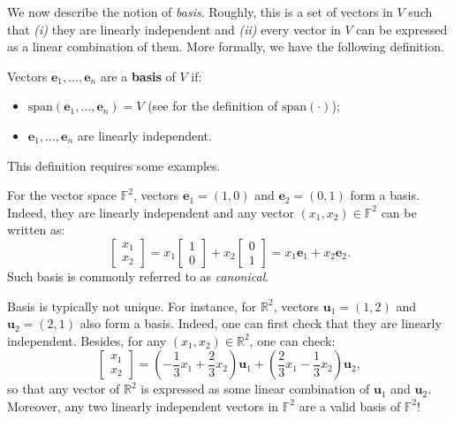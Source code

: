 \documentclass[../../book.tex]{subfiles}
\begin{document}
We now describe the notion of \textit{basis}. 
Roughly, this is a set of vectors in $V$ such that \textit{(i)} they are linearly independent and \textit{(ii)} every vector in $V$ can be expressed as a linear combination of them.
More formally, we have the following definition.
\begin{definition}
    Vectors $\mathbf{e}_1,\dots,\mathbf{e}_n$ are a \textbf{basis} of $V$ if:
    \begin{itemize}
        \item $\text{span}(\mathbf{e}_1,\dots,\mathbf{e}_n) = V$ (see  for the definition of $\text{span}(\cdot)$);
        \item $\mathbf{e}_1,\dots,\mathbf{e}_n$ are linearly independent.
    \end{itemize}
\end{definition}

This definition requires some examples.

\begin{example}
    For the vector space $\mathbb{F}^2$, vectors $\mathbf{e}_1=(1,0)$ and $\mathbf{e}_2=(0,1)$ form a basis.
    Indeed, they are linearly independent and any vector $(x_1,x_2) \in \mathbb{F}^2$ can be written as:
    \begin{equation*}
        \begin{bmatrix}
            x_1 \\ x_2
        \end{bmatrix} = x_1\begin{bmatrix}
            1 \\ 0
        \end{bmatrix} + x_2\begin{bmatrix}
            0 \\ 1
        \end{bmatrix} = x_1\mathbf{e}_1 + x_2\mathbf{e}_2.
    \end{equation*}
    Such basis is commonly referred to as \textit{canonical}. 
\end{example}

\begin{example}
    Basis is typically not unique. 
    For instance, for $\mathbb{R}^2$, vectors $\mathbf{u}_1=(1,2)$ and $\mathbf{u}_2=(2,1)$ also form a basis.
    Indeed, one can first check that they are linearly independent. 
    Besides, for any $(x_1,x_2) \in \mathbb{R}^2$, one can check:
    \begin{equation*}
        \begin{bmatrix}
            x_1 \\ x_2
        \end{bmatrix} = \left(-\frac{1}{3}x_1 + \frac{2}{3}x_2\right)\mathbf{u}_1 + \left(\frac{2}{3}x_1 - \frac{1}{3}x_2\right)\mathbf{u}_2,
    \end{equation*}
    so that any vector of $\mathbb{R}^2$ is expressed as some linear combination of $\mathbf{u}_1$ and $\mathbf{u}_2$.
    Moreover, any two linearly independent vectors in $\mathbb{F}^2$ are a valid basis of $\mathbb{F}^2$!
\end{example}
\end{document}
